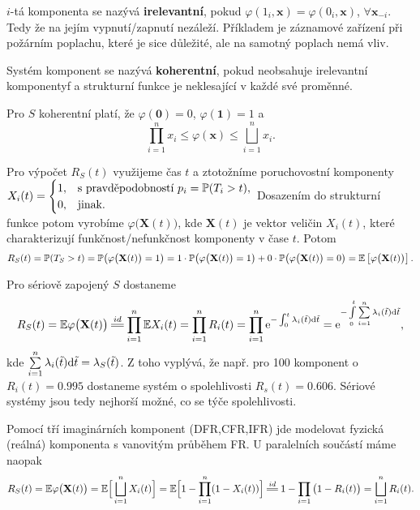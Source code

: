 \begin{define}
	$i$-tá komponenta se nazývá \textbf{irelevantní}, pokud $\varphi(1_i,\textbf{x})=\varphi(0_i,\textbf{x})$, $\forall\textbf{x}_{-i}$. Tedy že na jejím vypnutí/zapnutí nezáleží. Příkladem je záznamové zařízení při požárním poplachu, které je sice důležité, ale na samotný poplach nemá vliv.
\end{define}

\begin{define}
	Systém komponent se nazývá \textbf{koherentní}, pokud neobsahuje irelevantní komponentyf a strukturní funkce je neklesající v každé své proměnné.
\end{define}

\begin{theorem}
	Pro $S$ koherentní platí, že $\varphi(\textbf{0})=0$, $\varphi(\textbf{1})=1$ a $$ \prod_{i=1}^n x_i\leq \varphi(\textbf{x})\leq \bigsqcup_{i=1}^n x_i. $$
\end{theorem}

\begin{corollary}
	Pro výpočet $R_S(t)$ využijeme čas $t$ a ztotožníme poruchovostní komponenty $X_i(t)=\begin{cases}
1,&\text{s pravděpodobností }p_i=\mathbb{P}(T_i>t),\\0,&\text{jinak.}
\end{cases}$ Dosazením do strukturní funkce potom vyrobíme $\varphi\big(\textbf{X}(t)\big)$, kde $\textbf{X}(t)$ je vektor veličin $X_i(t)$, které charakterizují funkčnost/nefunkčnost komponenty v čase $t$. Potom
$$ R_S(t)=\mathbb{P}(T_S>t)=\mathbb{P}\big(\varphi\big(\textbf{X}(t)\big)=1\big)=1\cdot\mathbb{P}\big(\varphi\big(\textbf{X}(t)\big)=1\big)+0\cdot\mathbb{P}\big(\varphi\big(\textbf{X}(t)\big)=0\big)=\mathbb{E}\left[ \varphi\big(\textbf{X}(t)\big) \right]. $$
\end{corollary}

\begin{example}
	Pro sériově zapojený $S$ dostaneme
	$$ R_S(t)=\E \varphi\big(\textbf{X}(t)\big)\equal{id}\prod_{i=1}^n \E X_i(t)=\prod_{i=1}^n R_i(t)=\prod_{i=1}^n \e{-\int_{0}^{t}\lambda_i(\tilde{t})\d\tilde{t}}=\e{-\int\limits_{0}^t\sumin \lambda_i(\tilde{t})\d\tilde{t}}, $$
	kde $\sum\limits_{i=1}^{n} \lambda_i(\tilde{t})\mathrm{d}\tilde{t}=\lambda_S(\tilde{t})$. Z toho vyplývá, že např. pro 100 komponent o $R_i(t)=0.995$ dostaneme systém o spolehlivosti $R_s(t)=0.606$. Sériové systémy jsou tedy nejhorší možné, co se týče spolehlivosti. 
\end{example}

\begin{example}
	Pomocí tří imaginárních komponent (DFR,CFR,IFR) jde modelovat fyzická (reálná) komponenta s vanovitým průběhem FR. U paralelních součástí máme naopak 
	$$ R_S(t)=\E\varphi\big(\textbf{X}(t)\big)=\E\Big[\bigsqcup_{i=1}^n X_i(t)\Big]=\E\Big[1-\prod_{i=1}^n(1-X_i(t))\Big]\equal{id}1-\prod_{i=1}\big(1-R_i(t)\big)=\bigsqcup_{i=1}^n R_i(t). $$
\end{example}

